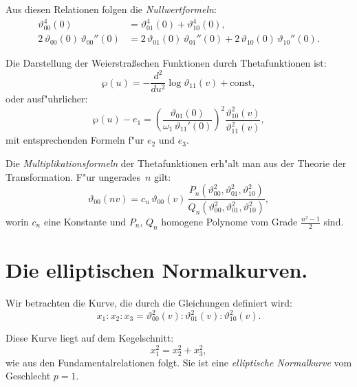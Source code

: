 \documentclass[12pt,a4paper]{article}
\theoremstyle{definition}
\begin{document}
\newpage

Aus diesen Relationen folgen die \emph{Nullwertformeln}:
\begin{align*}
\vartheta_{00}^4(0) &= \vartheta_{01}^4(0) + \vartheta_{10}^4(0),\\
2\,\vartheta_{00}(0)\,\vartheta_{00}''(0) &= 2\,\vartheta_{01}(0)\,\vartheta_{01}''(0) + 2\,\vartheta_{10}(0)\,\vartheta_{10}''(0).
\end{align*}

Die Darstellung der Weierstra\ss{}schen Funktionen durch Thetafunktionen ist:
\begin{equation}\tag{1}
\wp(u) = -\frac{d^2}{du^2}\log\vartheta_{11}(v) + \text{const},
\end{equation}
oder ausf"uhrlicher:
\begin{equation}\tag{2}
\wp(u) - e_1 = \left(\frac{\vartheta_{01}(0)}{\omega_1\,\vartheta_{11}'(0)}\right)^2 \frac{\vartheta_{10}^2(v)}{\vartheta_{11}^2(v)},
\end{equation}
mit entsprechenden Formeln f"ur $e_2$ und $e_3$.

Die \emph{Multiplikationsformeln} der Thetafunktionen erh"alt man aus der Theorie der Transformation. F"ur ungerades~$n$ gilt:
\begin{equation}\tag{3}
\vartheta_{00}(nv) = c_n\,\vartheta_{00}(v)\,\frac{P_n(\vartheta_{00}^2, \vartheta_{01}^2, \vartheta_{10}^2)}{Q_n(\vartheta_{00}^2, \vartheta_{01}^2, \vartheta_{10}^2)},
\end{equation}
worin $c_n$ eine Konstante und $P_n$, $Q_n$ homogene Polynome vom Grade $\frac{n^2-1}{2}$ sind.

\newpage

\section{Die elliptischen Normalkurven.}

Wir betrachten die Kurve, die durch die Gleichungen definiert wird:
\begin{equation}\tag{1}
x_1 : x_2 : x_3 = \vartheta_{00}^2(v) : \vartheta_{01}^2(v) : \vartheta_{10}^2(v).
\end{equation}

Diese Kurve liegt auf dem Kegelschnitt:
\begin{equation}\tag{2}
x_1^2 = x_2^2 + x_3^2,
\end{equation}
wie aus den Fundamentalrelationen folgt. Sie ist eine \emph{elliptische Normalkurve} vom Geschlecht $p = 1$.
\end{document}
